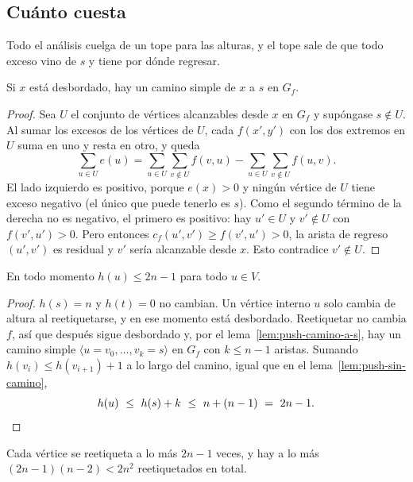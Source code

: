 \documentclass[11pt,letterpaper]{article}
\begin{document}
\subsection*{Cuánto cuesta}

Todo el análisis cuelga de un tope para las alturas, y el tope sale de
que todo exceso vino de $s$ y tiene por dónde regresar.

\begin{lema}
  \label{lem:push-camino-a-s}
  Si $x$ está desbordado, hay un camino simple de $x$ a $s$ en $G_f$.
\end{lema}

\begin{proof}
  Sea $U$ el conjunto de vértices alcanzables desde $x$ en $G_f$ y
  supóngase $s \notin U$. Al sumar los excesos de los vértices de $U$,
  cada $f(x', y')$ con los dos extremos en $U$ suma en uno y resta en
  otro, y queda
  \[
    \sum_{u \in U} e(u)
    = \sum_{u \in U} \sum_{v \notin U} f(v, u)
    - \sum_{u \in U} \sum_{v \notin U} f(u, v) .
  \]
  El lado izquierdo es positivo, porque $e(x) > 0$ y ningún vértice de
  $U$ tiene exceso negativo (el único que puede tenerlo es $s$). Como
  el segundo término de la derecha no es negativo, el primero es
  positivo: hay $u' \in U$ y $v' \notin U$ con $f(v', u') > 0$. Pero
  entonces $c_f(u', v') \ge f(v', u') > 0$, la arista de regreso
  $(u', v')$ es residual y $v'$ sería alcanzable desde $x$. Esto
  contradice $v' \notin U$.
\end{proof}

\begin{lema}
  \label{lem:push-tope-alturas}
  En todo momento $h(u) \le 2n - 1$ para todo $u \in V$.
\end{lema}

\begin{proof}
  $h(s) = n$ y $h(t) = 0$ no cambian. Un vértice interno $u$ solo
  cambia de altura al reetiquetarse, y en ese momento está desbordado.
  Reetiquetar no cambia $f$, así que después sigue desbordado y, por el
  lema~\ref{lem:push-camino-a-s}, hay un camino simple
  $\langle u = v_0, \dots, v_k = s\rangle$ en $G_f$ con $k \le n - 1$
  aristas. Sumando $h(v_i) \le h(v_{i+1}) + 1$ a lo largo del camino,
  igual que en el lema~\ref{lem:push-sin-camino},
  \[
    h(u) \ \le\ h(s) + k \ \le\ n + (n - 1) \ =\ 2n - 1 . \qedhere
  \]
\end{proof}

\begin{corolario}
  \label{cor:push-reetiquetados}
  Cada vértice se reetiqueta a lo más $2n - 1$ veces, y hay a lo más
  $(2n - 1)(n - 2) < 2n^2$ reetiquetados en total.
\end{corolario}
\end{document}
